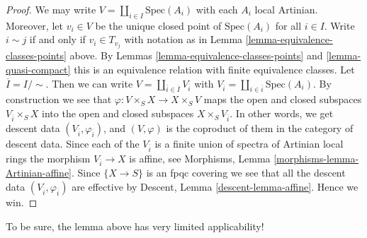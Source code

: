 \begin{proof}
We may write $V = \coprod_{i \in I} \text{Spec}(A_i)$
with each $A_i$ local Artinian. Moreover, let
$v_i \in V$ be the unique closed point of $\text{Spec}(A_i)$
for all $i \in I$. Write $i \sim j$ if and only if
$v_i \in T_{v_j}$ with notation as in
Lemma \ref{lemma-equivalence-classes-points} above.
By Lemmas \ref{lemma-equivalence-classes-points} and \ref{lemma-quasi-compact}
this is an equivalence relation with finite equivalence
classes. Let $\overline{I} = I/\sim$. Then we can write
$V = \coprod_{\overline{i} \in \overline{I}} V_{\overline{i}}$
with
$V_{\overline{i}} = \coprod_{i \in \overline{i}} \text{Spec}(A_i)$.
By construction we see that
$\varphi : V \times_S X \to X \times_S V$ maps
the open and closed subspaces $V_{\overline{i}} \times_S X$
into the open and closed subspaces $X \times_S V_{\overline{i}}$.
In other words, we get descent data
$(V_{\overline{i}}, \varphi_{\overline{i}})$, and
$(V, \varphi)$ is the coproduct of them in the category of
descent data.
Since each of the $V_{\overline{i}}$ is a finite union of
spectra of Artinian local rings the morphism $V_{\overline{i}} \to X$
is affine, see Morphisms, Lemma \ref{morphisms-lemma-Artinian-affine}.
Since $\{X \to S\}$ is an fpqc covering we see that all
the descent data $(V_{\overline{i}}, \varphi_{\overline{i}})$ are effective
by Descent, Lemma \ref{descent-lemma-affine}.
Hence we win.
\end{proof}

\noindent
To be sure, the lemma above has very limited applicability!


















